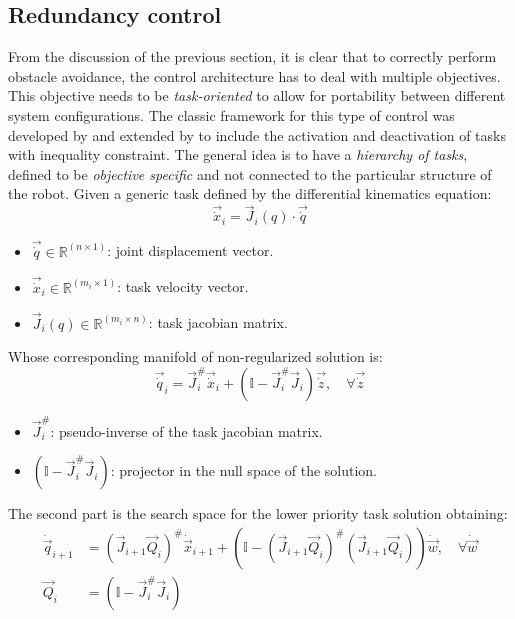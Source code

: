 \subsection{Redundancy control}
From the discussion of the previous section, it is clear that to correctly perform obstacle avoidance, the control architecture has to deal with multiple objectives. This objective needs to be \textit{task-oriented} to allow for portability between different system configurations.
The classic framework for this type of control was developed by \cite{slotine1991general} and extended by \cite{simetti2016novel} to include the activation and deactivation of tasks with inequality constraint.
The general idea is to have a \textit{hierarchy of tasks}, defined to be \textit{objective specific} and not connected to the particular structure of the robot.
Given a generic task defined by the differential kinematics equation:
\begin{equation}
	\vec{\dot{x}}_i = \vec{J}_i(q) \cdot \vec{\dot{q}}
\end{equation}
\begin{itemize}
	\item $\vec{\dot{q}} \in \mathbb{R}^{(n\times1)}$: joint displacement vector.
	\item $\vec{\dot{x}}_i \in \mathbb{R}^{(m_i\times 1)}$: task velocity vector.
	\item $\vec{J}_i(q) \in \mathbb{R}^{(m_i\times n)}$: task jacobian matrix.
\end{itemize}
\noindent Whose corresponding manifold of non-regularized solution is:
\begin{equation}
	\vec{\dot{q}}_i = \vec{J}^{\#}_i\vec{\dot{x}}_i + (\mathbb{I} - \vec{J}^{\#}_i\vec{J}_{i})\vec{\dot{z}}, \quad \forall \vec{\dot{z}}
\end{equation}
\begin{itemize}
	\item $\vec{J}^{\#}_i$: pseudo-inverse of the task jacobian matrix.
	\item $(\mathbb{I} - \vec{J}^{\#}_i\vec{J}_{i})$: projector in the null space of the solution.
\end{itemize}
\noindent The second part is the search space for the lower priority task solution obtaining:
\begin{equation}
	\begin{aligned}
		\dot{\vec{q}}_{i+1} &= (\vec{J}_{i+1}\vec{Q}_i)^{\#} \dot{\vec{x}}_{i+1} + \left( \mathbb{I} - (\vec{J}_{i+1}\vec{Q}_i)^{\#} (\vec{J}_{i+1}\vec{Q}_i) \right) \dot{\vec{w}}, \quad \forall \dot{\vec{w}} \\
		\vec{Q}_i &= (\mathbb{I} - \vec{J}^{\#}_i\vec{J}_{i})
	\end{aligned}
\end{equation}
